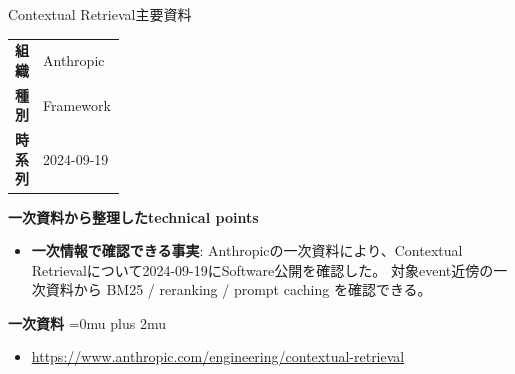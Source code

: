 \begin{technicalnote}{Contextual Retrieval}{主要資料}
\begingroup
\begin{tabularx}{\linewidth}{@{}>{\bfseries}p{0.22\linewidth}X@{}}
組織 & Anthropic \\
種別 & Framework \\
時系列 & 2024-09-19 \\
\end{tabularx}
\smallskip
{\bfseries 一次資料から整理したtechnical points}
\begin{itemize}[leftmargin=1.5em,itemsep=0.35em]
\item \textbf{一次情報で確認できる事実}: Anthropicの一次資料により、Contextual Retrievalについて2024-09-19にSoftware公開を確認した。 対象event近傍の一次資料から BM25 / reranking / prompt caching を確認できる。
\end{itemize}
\begin{minipage}{\linewidth}
\begin{samepage}
{\bfseries 一次資料}
\begingroup\sloppy
\Urlmuskip=0mu plus 2mu\relax
\begin{itemize}[leftmargin=1.5em,itemsep=0.25em]
\item {\scriptsize\url{https://www.anthropic.com/engineering/contextual-retrieval}}
\end{itemize}
\endgroup
\end{samepage}
\end{minipage}
\endgroup
\end{technicalnote}
\medskip

